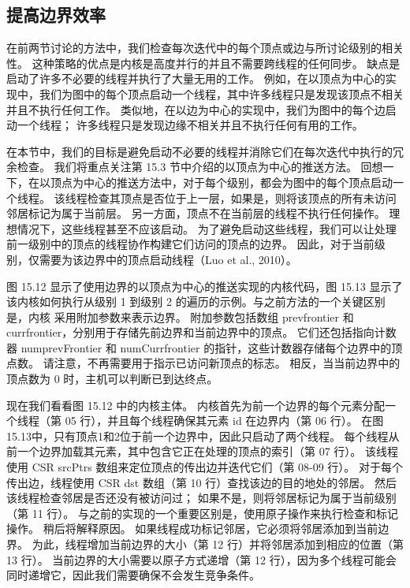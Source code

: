 \subsection{提高边界效率}
在前两节讨论的方法中，我们检查每次迭代中的每个顶点或边与所讨论级别的相关性。 这种策略的优点是内核是高度并行的并且不需要跨线程的任何同步。 缺点是启动了许多不必要的线程并执行了大量无用的工作。 例如，在以顶点为中心的实现中，我们为图中的每个顶点启动一个线程，其中许多线程只是发现该顶点不相关并且不执行任何工作。 类似地，在以边为中心的实现中，我们为图中的每个边启动一个线程； 许多线程只是发现边缘不相关并且不执行任何有用的工作。

在本节中，我们的目标是避免启动不必要的线程并消除它们在每次迭代中执行的冗余检查。 我们将重点关注第 15.3 节中介绍的以顶点为中心的推送方法。 回想一下，在以顶点为中心的推送方法中，对于每个级别，都会为图中的每个顶点启动一个线程。 该线程检查其顶点是否位于上一层，如果是，则将该顶点的所有未访问邻居标记为属于当前层。 另一方面，顶点不在当前层的线程不执行任何操作。 理想情况下，这些线程甚至不应该启动。 为了避免启动这些线程，我们可以让处理前一级别中的顶点的线程协作构建它们访问的顶点的边界。 因此，对于当前级别，仅需要为该边界中的顶点启动线程（Luo et al., 2010）。

图 15.12 显示了使用边界的以顶点为中心的推送实现的内核代码，图 15.13 显示了该内核如何执行从级别 1 到级别 2 的遍历的示例。与之前方法的一个关键区别是，内核 采用附加参数来表示边界。 附加参数包括数组 prevfrontier 和 currfrontier，分别用于存储先前边界和当前边界中的顶点。 它们还包括指向计数器 numprevFrontier 和 numCurrfrontier 的指针，这些计数器存储每个边界中的顶点数。 请注意，不再需要用于指示已访问新顶点的标志。 相反，当当前边界中的顶点数为 0 时，主机可以判断已到达终点。

现在我们看看图 15.12 中的内核主体。 内核首先为前一个边界的每个元素分配一个线程（第 05 行），并且每个线程确保其元素 id 在边界内（第 06 行）。 在图15.13中，只有顶点1和2位于前一个边界中，因此只启动了两个线程。 每个线程从前一个边界加载其元素，其中包含它正在处理的顶点的索引（第 07 行）。 该线程使用 CSR srcPtrs 数组来定位顶点的传出边并迭代它们（第 08-09 行）。 对于每个传出边，线程使用 CSR dst 数组（第 10 行）查找该边的目的地处的邻居。 然后该线程检查邻居是否还没有被访问过； 如果不是，则将邻居标记为属于当前级别（第 11 行）。 与之前的实现的一个重要区别是，使用原子操作来执行检查和标记操作。 稍后将解释原因。 如果线程成功标记邻居，它必须将邻居添加到当前边界。 为此，线程增加当前边界的大小（第 12 行）并将邻居添加到相应的位置（第 13 行）。 当前边界的大小需要以原子方式递增（第 12 行），因为多个线程可能会同时递增它，因此我们需要确保不会发生竞争条件。

